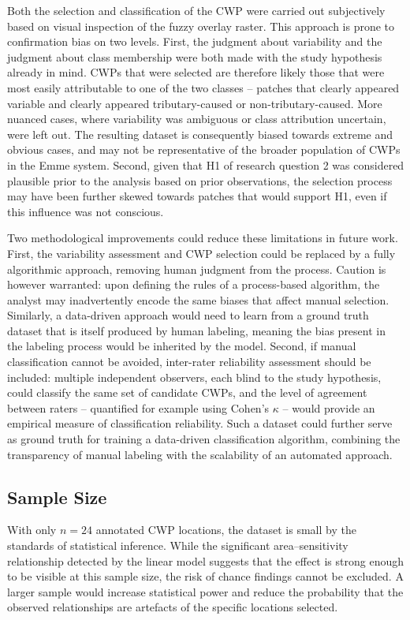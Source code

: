 Both the selection and classification of the CWP were carried out subjectively 
based on visual inspection of the fuzzy overlay raster. This approach is prone 
to confirmation bias on two levels. First, the judgment about variability and 
the judgment about class membership were both made with the study hypothesis 
already in mind. CWPs that were selected are therefore likely those that were 
most easily attributable to one of the two classes -- patches that clearly 
appeared variable and clearly appeared tributary-caused or non-tributary-caused. 
More nuanced cases, where variability was ambiguous or class attribution 
uncertain, were left out. The resulting dataset is consequently biased towards 
extreme and obvious cases, and may not be representative of the broader 
population of CWPs in the Emme system. Second, given that H1 of research 
question 2 was considered plausible prior to the analysis based on prior 
observations, the selection process may have been further skewed towards patches 
that would support H1, even if this influence was not conscious.

Two methodological improvements could reduce these limitations in future work. 
First, the variability assessment and CWP selection could be replaced by a fully 
algorithmic approach, removing human judgment from the process. Caution is 
however warranted: upon defining the rules of a process-based algorithm, the 
analyst may inadvertently encode the same biases that affect manual selection. 
Similarly, a data-driven approach would need to learn from a ground truth dataset 
that is itself produced by human labeling, meaning the bias present in the 
labeling process would be inherited by the model. Second, if manual 
classification cannot be avoided, inter-rater reliability assessment should be 
included: multiple independent observers, each blind to the study hypothesis, 
could classify the same set of candidate CWPs, and the level of agreement between 
raters -- quantified for example using Cohen's $\kappa$ -- would provide an 
empirical measure of classification reliability. Such a dataset could further 
serve as ground truth for training a data-driven classification algorithm, 
combining the transparency of manual labeling with the scalability of an 
automated approach.

\subsection{Sample Size}

With only $n = 24$ annotated CWP locations, the dataset is small by the 
standards of statistical inference. While the significant area--sensitivity 
relationship detected by the linear model suggests that the effect is strong 
enough to be visible at this sample size, the risk of chance findings cannot 
be excluded. A larger sample would increase statistical power and reduce the 
probability that the observed relationships are artefacts of the specific 
locations selected.

